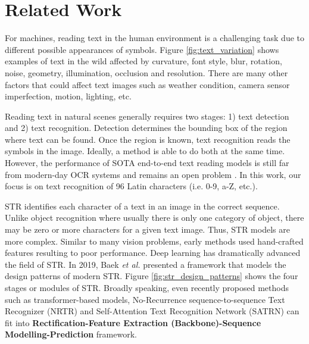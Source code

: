 \documentclass[runningheads]{llncs}
\begin{document}
\section{Related Work}

For machines, reading text in the human environment is a challenging task due to different possible appearances of symbols. Figure \ref{fig:text_variation} shows examples of text in the wild affected by curvature, font style, blur, rotation, noise, geometry, illumination, occlusion and resolution. There are many other factors that could affect text images such as weather condition, camera sensor imperfection, motion, lighting, etc. 

Reading text in natural scenes generally requires two stages: 1) text detection and 2) text recognition. Detection determines the bounding box of the region where text can be found. Once the region is known, text recognition reads the symbols in the image. Ideally, a method is able to do both at the same time. However, the performance of SOTA end-to-end text reading models is still far from modern-day OCR systems and remains an open problem \cite{chen2020text}. In this work, our focus is on text recognition of 96 Latin characters (i.e. 0-9, a-Z, etc.).

STR identifies each character of a text in an image in the correct sequence. Unlike object recognition where usually there is only one category of object, there may be zero or more characters for a given text image. Thus, STR models are more complex. Similar to many vision problems, early methods \cite{neumann2012real,yao2014unified} used hand-crafted features resulting to poor performance. Deep learning has dramatically advanced the field of STR. In 2019, Baek \textit{et al.} \cite{baek2019wrong} presented a framework that models the design patterns of modern STR. Figure \ref{fig:str_design_patterns} shows the four stages or modules of STR. Broadly speaking, even recently proposed methods such as transformer-based models, No-Recurrence sequence-to-sequence Text Recognizer (NRTR) \cite{sheng2019nrtr} and Self-Attention Text Recognition Network (SATRN) \cite{lee2020recognizing} can fit into \textbf{Rectification-Feature Extraction (Backbone)-Sequence Modelling-Prediction} framework.
\end{document}
